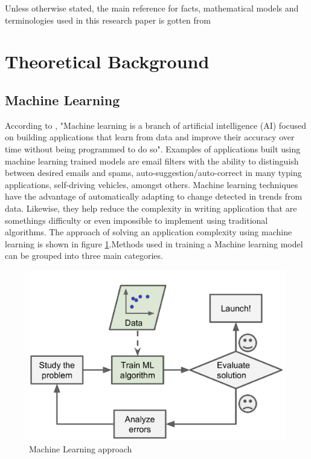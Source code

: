 \documentclass[conference]{IEEEtran}
\begin{document}
Unless otherwise stated, the main reference for facts, mathematical models and terminologies used in this research paper is gotten from \cite{massaron2016regression}
\section{Theoretical Background}
\subsection{Machine Learning}
According to \cite{ibm_cloud_education_2020}, "Machine learning is a branch of artificial intelligence (AI) focused on building applications that learn from data and improve their accuracy over time without being programmed to do so". Examples of applications built using machine learning trained models are email filters with the ability to distinguish between desired emails and spams, auto-suggestion/auto-correct in many typing applications, self-driving vehicles, amongst others. Machine learning techniques have the advantage of automatically adapting to change detected in trends from data. Likewise, they help reduce the complexity in writing application that are somethings difficulty or even impossible to implement using traditional algorithms. The approach of solving an application complexity using machine learning is shown in figure \ref{fig:machine_approach}.Methods used in training a Machine learning model can be grouped into three main categories.

\newpage
\begin{figure}[htbp]
	\centerline{\includegraphics [scale=0.32]{figures/machine_approach.png}}
	\caption{Machine Learning approach \cite{geron2019hands}}
	\label{fig:machine_approach}
\end{figure}
\end{document}
